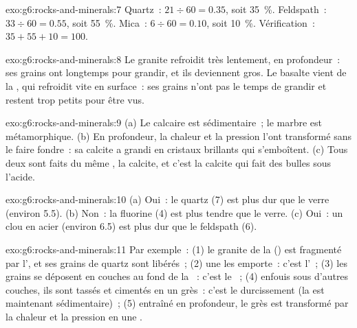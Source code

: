\begin{solution}{exo:g6:rocks-and-minerals:7}
Quartz~: $21 \div 60 = 0.35$, soit 35~\%. Feldspath~: $33 \div 60 = 0.55$,
soit 55~\%. Mica~: $6 \div 60 = 0.10$, soit 10~\%. Vérification~:
$35 + 55 + 10 = 100$.
\end{solution}

\begin{solution}{exo:g6:rocks-and-minerals:8}
Le granite refroidit très lentement, en profondeur~: ses grains ont
longtemps pour grandir, et ils deviennent gros. Le basalte vient de la
, qui refroidit vite en surface~: ses grains n'ont pas le temps de
grandir et restent trop petits pour être vus.
\end{solution}

\begin{solution}{exo:g6:rocks-and-minerals:9}
(a) Le calcaire est sédimentaire~; le marbre est métamorphique. (b) En
profondeur, la chaleur et la pression l'ont transformé sans le faire
fondre~: sa calcite a grandi en cristaux brillants qui s'emboîtent. (c) Tous
deux sont faits du même , la calcite, et c'est la calcite qui fait
des bulles sous l'acide.
\end{solution}

\begin{solution}{exo:g6:rocks-and-minerals:10}
(a) Oui~: le quartz (7) est plus dur que le verre (environ 5.5). (b) Non~:
la fluorine (4) est plus tendre que le verre. (c) Oui~: un clou en acier
(environ 6.5) est plus dur que le feldspath (6).
\end{solution}

\begin{solution}{exo:g6:rocks-and-minerals:11}
Par exemple~: (1) le granite de la  () est fragmenté par
l', et ses grains de quartz sont libérés~; (2) une  les
emporte~: c'est l'~; (3) les grains se déposent en couches au fond
de la ~: c'est le ~; (4) enfouis sous d'autres couches, ils sont
tassés et cimentés en un grès~: c'est le durcissement (la  est
maintenant sédimentaire)~; (5) entraîné en profondeur, le grès est
transformé par la chaleur et la pression en une .
\end{solution}

